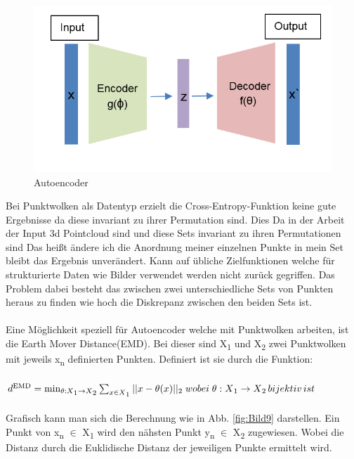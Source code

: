 \documentclass{llncs}
\begin{document}
\begin{figure}[htbp] 
	\centering
	\includegraphics[width=1.0\textwidth]{autoencoder.png}
	\caption{Autoencoder}
	\label{fig:Bild8}
\end{figure}

Bei Punktwolken als Datentyp erzielt die Cross-Entropy-Funktion keine gute Ergebnisse da diese invariant zu ihrer Permutation sind. Dies Da in der Arbeit der Input 3d Pointcloud sind und diese Sets  invariant zu ihren Permutationen sind Das heißt ändere ich die Anordnung meiner einzelnen Punkte in mein Set bleibt das Ergebnis unverändert.  Kann auf übliche Zielfunktionen welche für strukturierte Daten wie Bilder verwendet werden nicht zurück gegriffen. Das Problem dabei besteht das zwischen zwei unterschiedliche Sets von Punkten heraus zu finden wie hoch die Diskrepanz zwischen den beiden Sets ist\cite{invariant}. 
\\\\
Eine Möglichkeit speziell für Autoencoder welche mit Punktwolken arbeiten, ist die Earth Mover Distance(EMD). Bei dieser sind X\textsubscript{1} und X\textsubscript{2} zwei Punktwolken mit jeweils x\textsubscript{n} definierten Punkten\cite{autoencoderloss}. Definiert ist sie durch die Funktion:
\\\\
\begin{math}
d\textsuperscript{EMD}=\min_{\theta : X\textsubscript{1}\rightarrow X\textsubscript{2}}  \sum_{x\in X\textsubscript{1}}|| x - \theta(x)||\textsubscript{2} \;wobei\;\theta: X\textsubscript{1} \rightarrow X\textsubscript{2}\, bijektiv\, ist 
\end{math}
\\\\
Grafisch kann man sich die Berechnung wie in Abb. \ref{fig:Bild9} darstellen. Ein Punkt von x\textsubscript{n} $\in$ X\textsubscript{1} wird den nähsten Punkt y\textsubscript{n} $\in$  X\textsubscript{2} zugewiesen. Wobei die Distanz durch die Euklidische Distanz der jeweiligen Punkte ermittelt wird.
 
\end{document}
